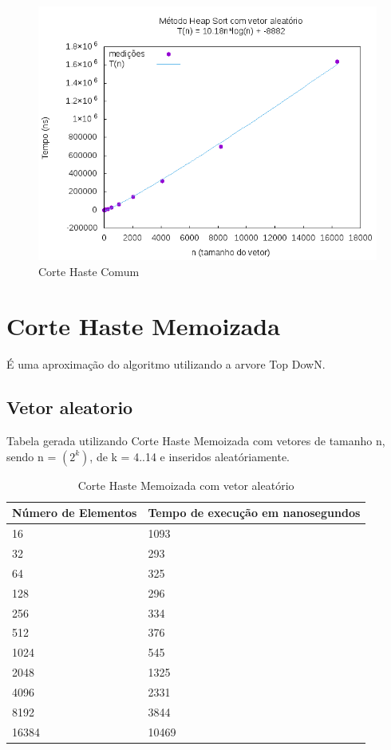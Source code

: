 \documentclass[12pt,a4paper,twoside]{report}
\begin{document}
\begin{figure}[H]
    \centering
    \includegraphics[width=0.7\linewidth]{graficos/HeapSort/vIntAleatorio/vIntAleatorio.png}
  \caption{Corte Haste Comum}
\end{figure}


\section{Corte Haste Memoizada}

É uma aproximação do algoritmo utilizando a arvore Top DowN.

\subsection{Vetor aleatorio}
Tabela gerada utilizando Corte Haste Memoizada com vetores de tamanho n, sendo n = $(2^k)$, de k = 4..14 e inseridos aleatóriamente.
\begin{table}[H]
\centering
\caption{Corte Haste Memoizada com vetor aleatório}
\label{my-label}
\begin{tabular}{|l|l|}
\hline
\multicolumn{1}{|c|}{\textbf{Número de Elementos}} & \multicolumn{1}{c|}{\textbf{Tempo de execução em nanosegundos}} \\ \hline
16 & 1093 \\ \hline
32 & 293 \\ \hline
64 & 325 \\ \hline
128 & 296 \\ \hline
256 & 334 \\ \hline
512 & 376 \\ \hline
1024 & 545 \\ \hline
2048 & 1325 \\ \hline
4096 & 2331 \\ \hline
8192 & 3844 \\ \hline
16384 & 10469 \\ \hline
\end{tabular}
\end{table}
\end{document}

